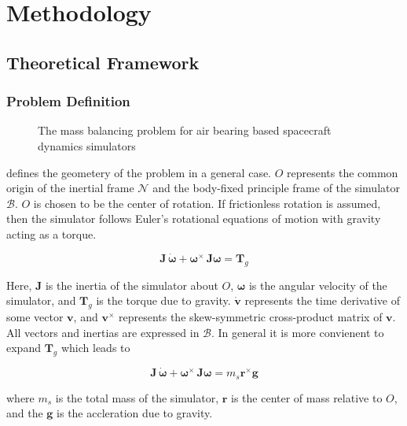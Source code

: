 \chapter{Methodology}\label{chap:methodology}

\section{Theoretical Framework}
\subsection{Problem Definition}\label{sec:mbs_problem}

\begin{figure}
    \centering
    
    \caption{The mass balancing problem for air bearing based spacecraft dynamics simulators}
    \label{fig:mbs_problem}
\end{figure}


 defines the geometery of the problem in a general case. $O$ represents the common origin of the inertial frame $\mathcal{N}$ and the body-fixed principle frame of the simulator $\mathcal{B}$. $O$ is chosen to be the center of rotation. If frictionless rotation is assumed, then the simulator follows Euler's rotational equations of motion with gravity acting as a torque. 

\begin{equation}
    \bm{J}\,\dot{\bm{\omega}} + \bm{\omega}^{\times}\,\bm{J}\bm{\omega} = \bm{T}_g
\end{equation}

Here, $\bm{J}$ is the inertia of the simulator about $O$, $\bm{\omega}$ is the angular velocity of the simulator, and $\bm{T}_g$ is the torque due to gravity. $\dot{\bm{v}}$ represents the time derivative of some vector $\bm{v}$, and $\bm{v}^{\times}$ represents the skew-symmetric cross-product matrix of $\bm{v}$. All vectors and inertias are expressed in $\mathcal{B}$. In general it is more convienent to expand $\bm{T}_g$ which leads to

\begin{equation}\label{equation:starting_eom}
    \bm{J}\,\dot{\bm{\omega}} + \bm{\omega}^{\times}\,\bm{J}\bm{\omega} = m_s\bm{r}^{\times}\bm{g}
\end{equation}

where $m_s$ is the total mass of the simulator, $\bm{r}$ is the center of mass relative to $O$, and the $\bm{g}$ is the accleration due to gravity.

